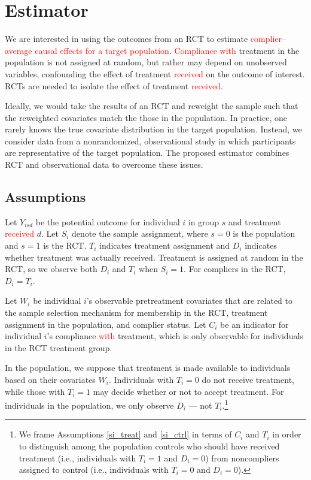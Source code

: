 \documentclass[hidelinks,12pt]{article}
\begin{document}
\section{Estimator} \label{estimator} 
We are interested in using the outcomes from an RCT to estimate \textcolor{red}{complier--average causal effects for a target population}. \textcolor{red}{Compliance with} treatment in the population is not assigned at random, but rather may depend on unobserved variables, confounding the effect of treatment \textcolor{red}{received} on the outcome of interest. RCTs are needed to isolate the effect of treatment \textcolor{red}{received}. 

Ideally, we would take the results of an RCT and reweight the sample such that the reweighted covariates match the those in the population. In practice, one rarely knows the true covariate distribution in the target population. Instead, we consider data from a nonrandomized, observational study in which participants are representative of the target population. The proposed estimator combines RCT and observational data to overcome these issues.

\subsection{Assumptions} \label{assumptions}
Let $Y_{isd}$ be the potential outcome for individual $i$ in group $s$ and treatment \textcolor{red}{received} $d$. Let $S_i$ denote the sample assignment, where $s=0$ is the population and $s=1$ is the RCT. $T_i$ indicates treatment assignment and $D_i$ indicates whether treatment was actually received. Treatment is assigned at random in the RCT, so we observe both $D_i$ and $T_i$ when $S_i = 1$. For compliers in the RCT, $D_i = T_i$.

Let $W_i$ be individual $i$'s observable pretreatment covariates that are related to the sample selection mechanism for membership in the RCT, treatment assignment in the population, and complier status. Let $C_i$ be an indicator for individual $i$'s compliance \textcolor{red}{with} treatment, which is only observable for individuals in the RCT treatment group. 

In the population, we suppose that treatment is made available to individuals based on their covariates $W_i$. Individuals with $T_i = 0$ do not receive treatment, while those with $T_i=1$ may decide whether or not to accept treatment. For individuals in the population, we only observe $D_i$ --- not $T_i$.\footnote{We frame Assumptions \eqref{si_treat} and \eqref{si_ctrl} in terms of $C_i$ and $T_i$ in order to distinguish among the population controls who should have received treatment (i.e., individuals with $T_i = 1$ and $D_i = 0$) from noncompliers assigned to control (i.e., individuals with $T_i = 0$ and $D_i = 0$).}
\end{document}
